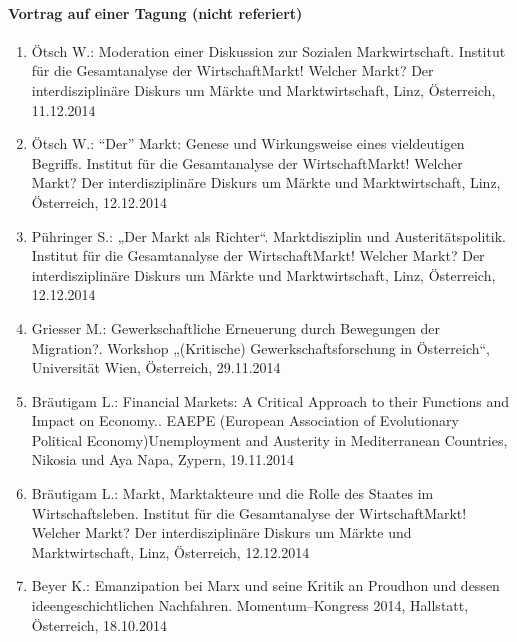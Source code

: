 \paragraph{Vortrag auf einer Tagung (nicht referiert)}
\begin{enumerate}
	\item Ötsch W.: Moderation einer Diskussion zur Sozialen Markwirtschaft. Institut für die Gesamtanalyse der WirtschaftMarkt! Welcher Markt? Der interdisziplinäre Diskurs um Märkte und Marktwirtschaft, Linz, Österreich, 11.12.2014
	\item Ötsch W.: “Der” Markt: Genese und Wirkungsweise eines vieldeutigen Begriffs. Institut für die Gesamtanalyse der WirtschaftMarkt! Welcher Markt? Der interdisziplinäre Diskurs um Märkte und Marktwirtschaft, Linz, Österreich, 12.12.2014
	\item Pühringer S.: „Der Markt als Richter“. Marktdisziplin und Austeritätspolitik. Institut für die Gesamtanalyse der WirtschaftMarkt! Welcher Markt? Der interdisziplinäre Diskurs um Märkte und Marktwirtschaft, Linz, Österreich, 12.12.2014
	\item Griesser M.: Gewerkschaftliche Erneuerung durch Bewegungen der Migration?. Workshop „(Kritische) Gewerkschaftsforschung in Österreich“, Universität Wien, Österreich, 29.11.2014
	\item Bräutigam L.: Financial Markets: A Critical Approach to their Functions and Impact on Economy.. EAEPE (European Association of Evolutionary Political Economy)Unemployment and Austerity in Mediterranean Countries, Nikosia und Aya Napa, Zypern, 19.11.2014
	\item Bräutigam L.: Markt, Marktakteure und die Rolle des Staates im Wirtschaftsleben. Institut für die Gesamtanalyse der WirtschaftMarkt! Welcher Markt? Der interdisziplinäre Diskurs um Märkte und Marktwirtschaft, Linz, Österreich, 12.12.2014
	\item Beyer K.: Emanzipation bei Marx und seine Kritik an Proudhon und dessen ideengeschichtlichen Nachfahren. Momentum--Kongress 2014, Hallstatt, Österreich, 18.10.2014
\end{enumerate}
